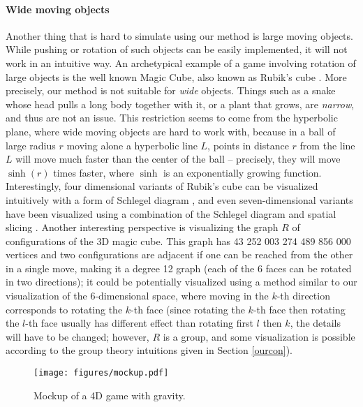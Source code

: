 \documentclass{article}
\begin{document}
\paragraph{Wide moving objects} Another thing that is hard to simulate using our method is large moving objects.
While pushing or rotation of such objects can be easily implemented, it will not work in an intuitive way. An archetypical
example of a game involving rotation of large objects is the well known Magic Cube, also known as Rubik's cube \cite{rubiks}.
More precisely, our method is not suitable for \emph{wide} objects. Things such as a snake
whose head pulls a long body together with it, or a plant that grows, are \emph{narrow}, and thus are not an issue.
This restriction seems to come from the hyperbolic plane, where wide moving objects are hard to work with, because 
in a ball of large radius $r$ moving alone a hyperbolic line $L$, points in distance $r$ from the line $L$ will move
much faster than the center of the ball \cite{hyperrogue} -- precisely, they will move $\sinh(r)$ times faster, where $\sinh$
is an exponentially growing function.
Interestingly, four dimensional variants of Rubik's cube can be visualized intuitively with a form of Schlegel diagram \cite{magic4},
and even seven-dimensional variants have been visualized using a combination of the Schlegel diagram and spatial slicing \cite{magic7}.
Another interesting perspective is visualizing the graph $R$ of configurations of the 3D magic cube. This graph has 
43 252 003 274 489 856 000 vertices and two configurations are adjacent if one can be reached from the other in a single move,
making it a degree 12 graph (each of the 6 faces can be rotated in two directions); it could be potentially visualized using
a method similar to our visualization of the 6-dimensional space, where moving in the $k$-th direction corresponds to rotating
the $k$-th face (since rotating the $k$-th face then rotating the $l$-th face usually has different effect than rotating first $l$ then $k$,
the details will have to be changed; however, $R$ is a group, and some visualization is possible according to the group theory intuitions
given in Section \ref{ourcon}).

\begin{figure}
\texttt{[image: figures/mockup.pdf]}
\caption{Mockup of a 4D game with gravity.\label{mockup}}
\end{figure}
\end{document}
